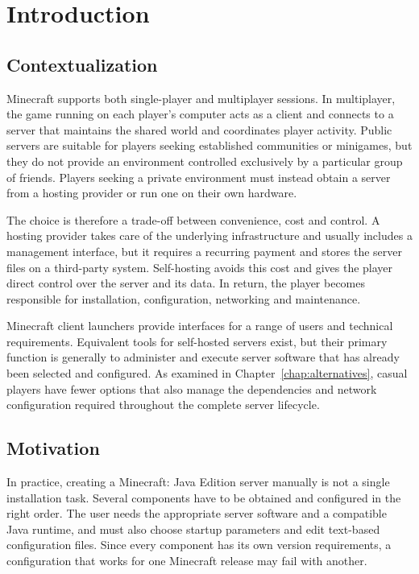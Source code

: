 
\chapter{Introduction}

\section{Contextualization}

Minecraft supports both single-player and multiplayer sessions. In multiplayer, the game running on each player's computer acts as a client and connects to a server that maintains the shared world and coordinates player activity. Public servers are suitable for players seeking established communities or minigames, but they do not provide an environment controlled exclusively by a particular group of friends. Players seeking a private environment must instead obtain a server from a hosting provider or run one on their own hardware.

The choice is therefore a trade-off between convenience, cost and control. A hosting provider takes care of the underlying infrastructure and usually includes a management interface, but it requires a recurring payment and stores the server files on a third-party system. Self-hosting avoids this cost and gives the player direct control over the server and its data. In return, the player becomes responsible for installation, configuration, networking and maintenance.

Minecraft client launchers provide interfaces for a range of users and technical requirements. Equivalent tools for self-hosted servers exist, but their primary function is generally to administer and execute server software that has already been selected and configured. As examined in Chapter~\ref{chap:alternatives}, casual players have fewer options that also manage the dependencies and network configuration required throughout the complete server lifecycle.


\section{Motivation}

In practice, creating a Minecraft: Java Edition server manually is not a single installation task. Several components have to be obtained and configured in the right order. The user needs the appropriate server software and a compatible Java runtime, and must also choose startup parameters and edit text-based configuration files. Since every component has its own version requirements, a configuration that works for one Minecraft release may fail with another.

